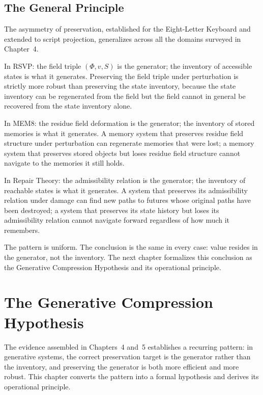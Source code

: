 \documentclass[12pt, oneside]{book}
\theoremstyle{flyxion}
\theoremstyle{definition}
\begin{document}
\section{The General Principle}

The asymmetry of preservation, established for the
Eight-Letter Keyboard and extended to script projection,
generalizes across all the domains surveyed in Chapter~4.

In RSVP: the field triple $(\Phi, v, S)$ is the generator;
the inventory of accessible states is what it generates.
Preserving the field triple under perturbation is strictly
more robust than preserving the state inventory, because
the state inventory can be regenerated from the field but
the field cannot in general be recovered from the state
inventory alone.

In MEM\textbar{}8: the residue field deformation is the
generator; the inventory of stored memories is what it
generates. A memory system that preserves residue field
structure under perturbation can regenerate memories that
were lost; a memory system that preserves stored objects
but loses residue field structure cannot navigate to the
memories it still holds.

In Repair Theory: the admissibility relation is the
generator; the inventory of reachable states is what it
generates. A system that preserves its admissibility
relation under damage can find new paths to futures whose
original paths have been destroyed; a system that preserves
its state history but loses its admissibility relation
cannot navigate forward regardless of how much it remembers.

The pattern is uniform. The conclusion is the same in
every case: value resides in the generator, not the
inventory. The next chapter formalizes this conclusion
as the Generative Compression Hypothesis and its
operational principle.

\chapter{The Generative Compression Hypothesis}

The evidence assembled in Chapters~4 and~5 establishes a
recurring pattern: in generative systems, the correct
preservation target is the generator rather than the
inventory, and preserving the generator is both more
efficient and more robust. This chapter converts the
pattern into a formal hypothesis and derives its
operational principle.
\end{document}
